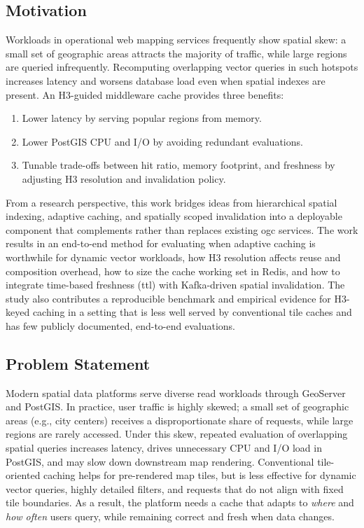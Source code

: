 \subsection{Motivation}
Workloads in operational web mapping services frequently show spatial skew: a small set of geographic areas attracts the majority of traffic, while large regions are queried infrequently. Recomputing overlapping vector queries in such hotspots increases latency and worsens database load even when spatial indexes are present. An H3-guided middleware cache provides three benefits: 
\begin{enumerate}
  \item Lower latency by serving popular regions from memory.
  \item Lower PostGIS CPU and I/O by avoiding redundant evaluations.
  \item Tunable trade-offs between hit ratio, memory footprint, and freshness by adjusting H3 resolution and invalidation policy.
\end{enumerate}

From a research perspective, this work bridges ideas from hierarchical spatial indexing, adaptive caching, and spatially scoped invalidation into a deployable component that complements rather than replaces existing \ac{ogc} services. The work results in an end-to-end method for evaluating when adaptive caching is worthwhile for dynamic vector workloads, how H3 resolution affects reuse and composition overhead, how to size the cache working set in Redis, and how to integrate time-based freshness (\ac{ttl}) with Kafka-driven spatial invalidation. The study also contributes a reproducible benchmark and empirical evidence for H3-keyed caching in a setting that is less well served by conventional tile caches and has few publicly documented, end-to-end evaluations.

\subsection{Problem Statement}
Modern spatial data platforms serve diverse read workloads through GeoServer and PostGIS. In practice, user traffic is highly skewed; a small set of geographic areas (e.g., city centers) receives a disproportionate share of requests, while large regions are rarely accessed. Under this skew, repeated evaluation of overlapping spatial queries increases latency, drives unnecessary CPU and I/O load in PostGIS, and may slow down downstream map rendering. Conventional tile-oriented caching helps for pre-rendered map tiles, but is less effective for dynamic vector queries, highly detailed filters, and requests that do not align with fixed tile boundaries. As a result, the platform needs a cache that adapts to \emph{where} and \emph{how often} users query, while remaining correct and fresh when data changes.

